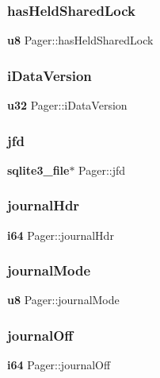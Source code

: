 \subsubsection{hasHeldSharedLock}
{\footnotesize\ttfamily \textbf{ u8} Pager\+::has\+Held\+Shared\+Lock}

\mbox{\label{struct_pager_a4464625e1489082ddb9129b6b5db0583}} 
\subsubsection{iDataVersion}
{\footnotesize\ttfamily \textbf{ u32} Pager\+::i\+Data\+Version}

\mbox{\label{struct_pager_a81057c4420b8278e8141cf626abf4f0d}} 
\subsubsection{jfd}
{\footnotesize\ttfamily \textbf{ sqlite3\+\_\+file}$\ast$ Pager\+::jfd}

\mbox{\label{struct_pager_a7f4a7f5f0245b063a82c185f40bad7f0}} 
\subsubsection{journalHdr}
{\footnotesize\ttfamily \textbf{ i64} Pager\+::journal\+Hdr}

\mbox{\label{struct_pager_a9ad7bd09f1c9323d943ee17ddf42e46e}} 
\subsubsection{journalMode}
{\footnotesize\ttfamily \textbf{ u8} Pager\+::journal\+Mode}

\mbox{\label{struct_pager_ad3cffdc0987965fa6a472b19355f48df}} 
\subsubsection{journalOff}
{\footnotesize\ttfamily \textbf{ i64} Pager\+::journal\+Off}

\mbox{\label{struct_pager_ae381db4e0b49f92596b0cdeb279e6bc6}} 
